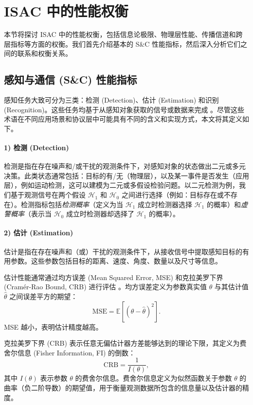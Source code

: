 \section{ISAC 中的性能权衡}

本节将探讨 ISAC 中的性能权衡，包括信息论极限、物理层性能、传播信道和跨层指标等方面的权衡。我们首先介绍基本的 S\&C 性能指标，然后深入分析它们之间的联系和权衡关系。

\subsection{感知与通信 (S\&C) 性能指标}

感知任务大致可分为三类：检测 (Detection)、估计 (Estimation) 和识别 (Recognition)。这些任务均基于从感知对象获取的信号或数据来完成 \cite{10.1145/3310194}。尽管这些术语在不同应用场景和协议层中可能具有不同的含义和实现方式，本文将其定义如下。


\paragraph{1) 检测 (Detection)}
检测是指在存在噪声和/或干扰的观测条件下，对感知对象的状态做出二元或多元决策。此类状态通常包括：目标的有/无（物理层），以及某一事件是否发生（应用层），例如运动检测，这可以建模为二元或多假设检验问题。以二元检测为例，我们基于观测信号在两个假设 $\mathcal{H}_1$ 和 $\mathcal{H}_0$ 之间进行选择（例如：目标存在或不存在）。检测指标包括\textit{检测概率}（定义为当 $\mathcal{H}_1$ 成立时检测器选择 $\mathcal{H}_1$ 的概率）和\textit{虚警概率}（表示当 $\mathcal{H}_0$ 成立时检测器却选择了 $\mathcal{H}_1$ 的概率）\cite{kay1998fundamentals}。

\paragraph{2) 估计 (Estimation)}

估计是指在存在噪声和（或）干扰的观测条件下，从接收信号中提取感知目标的有用参数。这些参数包括目标的距离、速度、角度、数量以及尺寸等信息。

估计性能通常通过均方误差 (Mean Squared Error, MSE) 和克拉美罗下界 (Cramér-Rao Bound, CRB) 进行评估 \cite{restuccia2021ieee}。均方误差定义为参数真实值 $\theta$ 与其估计值 $\hat{\theta}$ 之间误差平方的期望：
\begin{equation}
	\mathrm{MSE} = \mathbb{E} \left[ (\theta - \hat{\theta})^2 \right].
\end{equation}
MSE 越小，表明估计精度越高。

克拉美罗下界 (CRB) 表示任意无偏估计器方差能够达到的理论下限，其定义为费舍尔信息 (Fisher Information, FI) 的倒数：
\begin{equation}
	\mathrm{CRB} = \frac{1}{I(\theta)},
\end{equation}
其中 $I(\theta)$ 表示参数 $\theta$ 的费舍尔信息。费舍尔信息定义为似然函数关于参数 $\theta$ 的曲率（负二阶导数）的期望值，用于衡量观测数据所包含的信息量以及估计器的精度。

